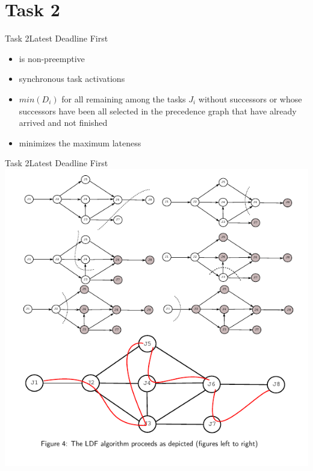 
\section{Task 2}

\setcounter{task}{1}

\begin{frame}{Task 2}{Latest Deadline First}
  \begin{itemize}
    \item is \alert{non-preemptive}
    \item \alert{synchronous task activations}
    \item $min(D_i)$ for all remaining among the tasks $J_i$ without successors or whose successors have been all selected in the \alert{precedence graph} that have already \alert{arrived} and \alert{not finished}
    \item \alert{minimizes} the \alert{maximum lateness}
  \end{itemize}
\end{frame}


\begin{frame}{Task 2}{Latest Deadline First}
  \centering
  \includegraphics[height=0.7\paperheight]{./figures/2_steps.png}
\end{frame}

